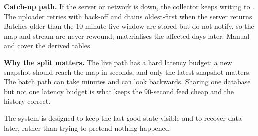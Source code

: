 \documentclass[10.5pt]{article}
\begin{document}
\vspace{4pt}
\begin{softcard}
{\bfseries Catch-up path.} If the server or network is down, the collector keeps writing to . The uploader retries with back-off and drains oldest-first when the server returns. Batches older than the 10-minute live window are stored but do not notify, so the map and stream are never rewound;  materialises the affected days later. Manual  and  cover the derived tables.
\end{softcard}

\vspace{3pt}
\begin{softcard}
{\bfseries Why the split matters.} The live path has a hard latency budget: a new snapshot should reach the map in seconds, and only the latest snapshot matters. The batch path can take minutes and can look backwards. Sharing one database but not one latency budget is what keeps the 90-second feed cheap and the history correct.
\end{softcard}

\newpage
{}

{\small
The system is designed to keep the last good state visible and to recover data later, rather than trying to pretend nothing happened.
}

\vspace{2pt}
\begin{center}
\end{center}
\end{document}
